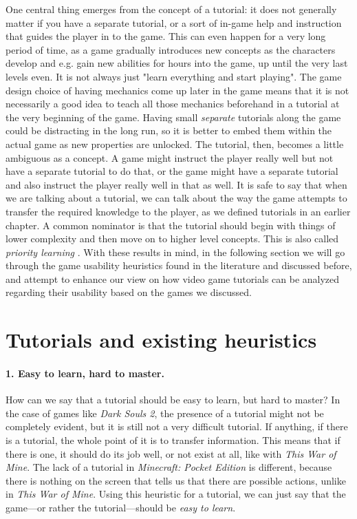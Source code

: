 One central thing emerges from the concept of a tutorial: it does not generally matter if you have a separate tutorial, or a sort of in-game help and instruction that guides the player in to the game. This can even happen for a very long period of time, as a game gradually introduces new concepts as the characters develop and e.g. gain new abilities for hours into the game, up until the very last levels even. It is not always just "learn everything and start playing". The game design choice of having mechanics come up later in the game means that it is not necessarily a good idea to teach all those mechanics beforehand in a tutorial at the very beginning of the game. Having small \textit{separate} tutorials along the game could be distracting in the long run, so it is better to embed them within the actual game as new properties are unlocked. The tutorial, then, becomes a little ambiguous as a concept. A game might instruct the player really well but not have a separate tutorial to do that, or the game might have a separate tutorial and also instruct the player really well in that as well. It is safe to say that when we are talking about a tutorial, we can talk about the way the game attempts to transfer the required knowledge to the player, as we defined tutorials in an earlier chapter. A common nominator is that the tutorial should begin with things of lower complexity and then move on to higher level concepts. This is also called \textit{priority learning} \cite{Bycer2016}. With these results in mind, in the following section we will go through the game usability heuristics found in the literature and discussed before, and attempt to enhance our view on how video game tutorials can be analyzed regarding their usability based on the games we discussed.

\section{Tutorials and existing heuristics}
\paragraph{1. Easy to learn, hard to master.} How can we say that a tutorial should be easy to learn, but hard to master? In the case of games like \textit{Dark Souls 2}, the presence of a tutorial might not be completely evident, but it is still not a very difficult tutorial. If anything, if there is a tutorial, the whole point of it is to transfer information. This means that if there is one, it should do its job well, or not exist at all, like with \textit{This War of Mine}. The lack of a tutorial in \textit{Minecraft: Pocket Edition} is different, because there is nothing on the screen that tells us that there are possible actions, unlike in \textit{This War of Mine}. Using this heuristic for a tutorial, we can just say that the game---or rather the tutorial---should be \textit{easy to learn}.

